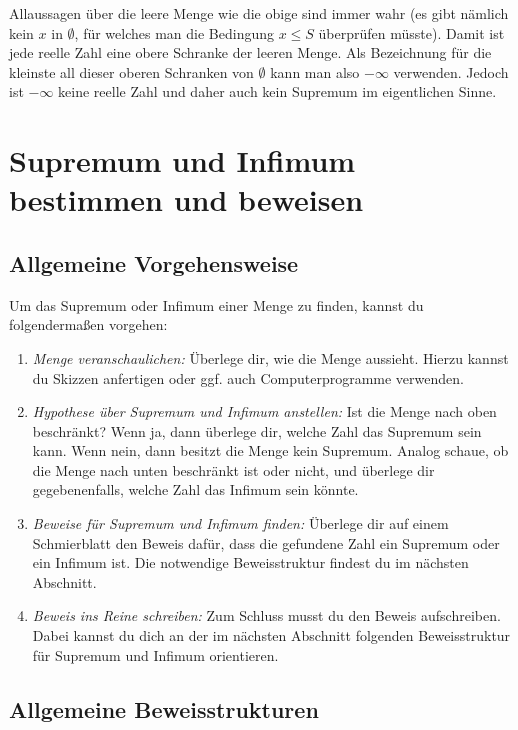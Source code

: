 \documentclass[fontsize=9pt,
               parskip=half-,
               DIV=14,
               listof=chapterentry,
               tocflat]{scrbook}
\begin{document}
\begin{answer*}
Allaussagen über die leere Menge wie die obige sind immer wahr (es gibt nämlich kein $x$ in $\emptyset $, für welches man die Bedingung $x\leq S$ überprüfen müsste). Damit ist jede reelle Zahl eine obere Schranke der leeren Menge. Als Bezeichnung für die kleinste all dieser oberen Schranken von $\emptyset $ kann man also $-\infty $ verwenden. Jedoch ist $-\infty $ keine reelle Zahl und daher auch kein Supremum im eigentlichen Sinne.

\end{answer*}

\chapter{Supremum und Infimum bestimmen und beweisen}

\section{Allgemeine Vorgehensweise}

Um das Supremum oder Infimum einer Menge zu finden, kannst du folgendermaßen vorgehen:

\begin{enumerate}
\item \emph{Menge veranschaulichen:} Überlege dir, wie die Menge aussieht. Hierzu kannst du Skizzen anfertigen oder ggf. auch Computerprogramme verwenden.
\item \emph{Hypothese über Supremum und Infimum anstellen:} Ist die Menge nach oben beschränkt? Wenn ja, dann überlege dir, welche Zahl das Supremum sein kann. Wenn nein, dann besitzt die Menge kein Supremum. Analog schaue, ob die Menge nach unten beschränkt ist oder nicht, und überlege dir gegebenenfalls, welche Zahl das Infimum sein könnte.
\item \emph{Beweise für Supremum und Infimum finden:} Überlege dir auf einem Schmierblatt den Beweis dafür, dass die gefundene Zahl ein Supremum oder ein Infimum ist. Die notwendige Beweisstruktur findest du im nächsten Abschnitt.
\item \emph{Beweis ins Reine schreiben:} Zum Schluss musst du den Beweis aufschreiben. Dabei kannst du dich an der im nächsten Abschnitt folgenden Beweisstruktur für Supremum und Infimum orientieren.
\end{enumerate}

\section{Allgemeine Beweisstrukturen}
\end{document}
